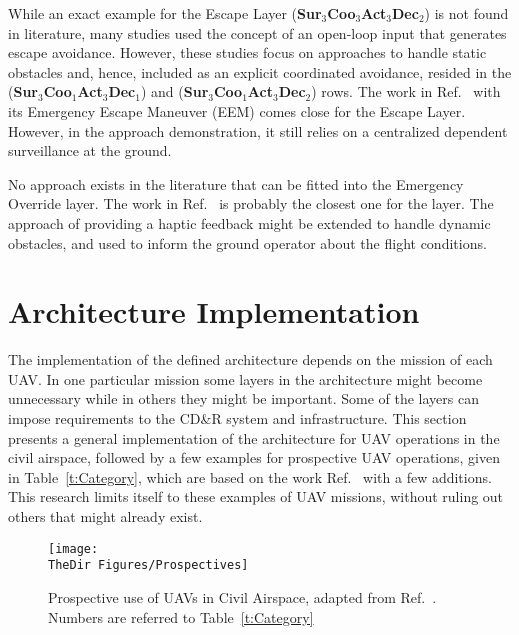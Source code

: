 While an exact example for the Escape Layer (\textbf{Sur$_3$Coo$_3$Act$_3$Dec$_2$}) is not found in literature, many studies used the concept of an open-loop input that generates escape avoidance. However, these studies focus on approaches to handle static obstacles and, hence, included as an explicit coordinated avoidance, resided in the (\textbf{Sur$_3$Coo$_1$Act$_3$Dec$_1$}) and (\textbf{Sur$_3$Coo$_1$Act$_3$Dec$_2$}) rows. The work in Ref.~\cite{Teo:04} with its Emergency Escape Maneuver (EEM) comes close for the Escape Layer. However, in the approach demonstration, it still relies on a centralized dependent surveillance at the ground.

No approach exists in the literature that can be fitted into the Emergency Override layer. The work in Ref.~\cite{Lam:09a} is probably the closest one for the layer. The approach of providing a haptic feedback might be extended to handle dynamic obstacles, and used to inform the ground operator about the flight conditions.

\section{Architecture Implementation}
The implementation of the defined architecture depends on the mission of each UAV. In one particular mission some layers in the architecture might become unnecessary while in others they might be important. Some of the layers can impose requirements to the CD\&R system and infrastructure. This section presents a general implementation of the architecture for UAV operations in the civil airspace, followed by a few examples for prospective UAV operations, given in Table~\ref{t:Category}, which are based on the work Ref.~\cite{degarmo:04} with a few additions. This research limits itself to these examples of UAV missions, without ruling out others that might already exist.

\begin{figure}[h]
	\centering
	\texttt{[image: \\TheDir Figures/Prospectives]}
	\caption{Prospective use of UAVs in Civil Airspace, adapted from Ref.~\cite{degarmo:04}. Numbers are referred to Table~\ref{t:Category}}
	\label{f:Prospectives}
\end{figure}

